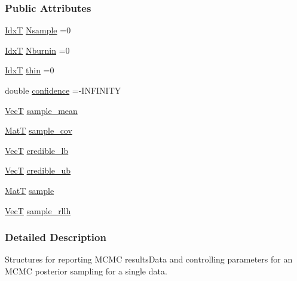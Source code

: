 \subsubsection*{Public Attributes}
\begin{DoxyCompactItemize}
\item 
\hyperlink{namespacemappel_ab17ec0f30b61ece292439d7ece81d3a8}{IdxT} \hyperlink{structmappel_1_1mcmc_1_1MCMCData_a601995701dceecb6350533f97067c379}{Nsample} =0
\item 
\hyperlink{namespacemappel_ab17ec0f30b61ece292439d7ece81d3a8}{IdxT} \hyperlink{structmappel_1_1mcmc_1_1MCMCData_a5aa4a9684f85cc11e448de4d5490a63c}{Nburnin} =0
\item 
\hyperlink{namespacemappel_ab17ec0f30b61ece292439d7ece81d3a8}{IdxT} \hyperlink{structmappel_1_1mcmc_1_1MCMCData_a07822492904641403d2ede5eac1f1279}{thin} =0
\item 
double \hyperlink{structmappel_1_1mcmc_1_1MCMCData_a4bc7f746b07b050b591ce80bf65be3bf}{confidence} =-\/I\+N\+F\+I\+N\+I\+TY
\item 
\hyperlink{namespacemappel_a2225ad69f358daa3f4f99282a35b9a3a}{VecT} \hyperlink{structmappel_1_1mcmc_1_1MCMCData_a89c09929c6a2a7695e5360559bc72b83}{sample\+\_\+mean}
\item 
\hyperlink{namespacemappel_a7091ab87c528041f7e2027195fad8915}{MatT} \hyperlink{structmappel_1_1mcmc_1_1MCMCData_a1703e010b2e55dd1c2e43886022dd311}{sample\+\_\+cov}
\item 
\hyperlink{namespacemappel_a2225ad69f358daa3f4f99282a35b9a3a}{VecT} \hyperlink{structmappel_1_1mcmc_1_1MCMCData_a504c8fa80e064bf56ba2d9dc70fbfcb7}{credible\+\_\+lb}
\item 
\hyperlink{namespacemappel_a2225ad69f358daa3f4f99282a35b9a3a}{VecT} \hyperlink{structmappel_1_1mcmc_1_1MCMCData_a710e11fed8e8ef6e516171ece46409bc}{credible\+\_\+ub}
\item 
\hyperlink{namespacemappel_a7091ab87c528041f7e2027195fad8915}{MatT} \hyperlink{structmappel_1_1mcmc_1_1MCMCData_a3e13858482ca8f898684eed95b9bf7f1}{sample}
\item 
\hyperlink{namespacemappel_a2225ad69f358daa3f4f99282a35b9a3a}{VecT} \hyperlink{structmappel_1_1mcmc_1_1MCMCData_a253ec198d03bf713be355ca38371558d}{sample\+\_\+rllh}
\end{DoxyCompactItemize}


\subsubsection{Detailed Description}
Structures for reporting M\+C\+MC results\+Data and controlling parameters for an M\+C\+MC posterior sampling for a single data. 

